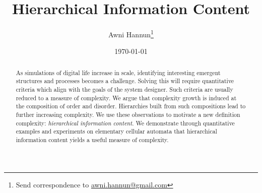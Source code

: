 \documentclass[12pt]{article}
\title{Hierarchical Information Content}
\author{Awni Hannun\footnote{
  Send correspondence to
  \href{mailto:awni.hannun@gmail.com}{awni.hannun@gmail.com}}}
\date{\today}
\theoremstyle{definition}
\begin{document}
\maketitle

\begin{abstract}
  As simulations of digital life increase in scale, identifying interesting
  emergent structures and processes becomes a challenge.  Solving this will
  require quantitative criteria which align with the goals of the system
  designer. Such criteria are usually reduced to a measure of complexity. We
  argue that complexity growth is induced at the composition of order and
  disorder. Hierarchies built from such compositions lead to further increasing
  complexity. We use these observations to motivate a new definition
  complexity: \emph{hierarchical information content}. We demonstrate through
  quantitative examples and experiments on elementary cellular automata that
  hierarchical information content yields a useful measure of complexity.
\end{abstract}







\end{document}
